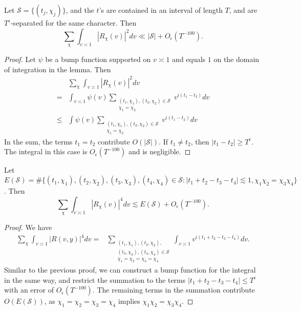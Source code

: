     \begin{lemma} \label{secondmoment1}
        Let $\mathcal{S}=\{(t_j,\chi_j)\}$, and the $t$'s are contained in an interval of length $T$, and are $T^\epsilon$-separated for the same character. Then \[
            \sum_{\chi} \int_{v\asymp 1} 
            \left|R_{\chi}\left(v\right)\right|^2dv \ll |\mathcal{S}|+ O_{\epsilon}(T^{-100}).
        \]
    \end{lemma}
    \begin{proof}
        
        Let $\psi$ be a bump function supported on $v\asymp 1$ and equals $1$ on the domain of integration in the lemma. Then
       \begin{align*}
        &\sum_{\chi} \int_{v\asymp 1} 
            \left|R_{\chi}\left(v\right)\right|^2dv\\
            =&\int_{v\asymp 1} \psi(v)\sum_{\substack{(t_1,\chi_1),(t_2,\chi_2)\in \mathcal{S}\\ \chi_1=\chi_2}}v^{i(t_1-t_2)}dv \\
            \leq&\int 
        \psi(v)\sum_{\substack{(t_1,\chi_1),(t_2,\chi_2)\in \mathcal{S}\\ \chi_1=\chi_2}}v^{i(t_1-t_2)}dv
        \end{align*}
        In the sum, the terms $t_1=t_2$ contribute $O(|\mathcal{S}|)$. If $t_1\neq t_2$, then $|t_1-t_2|\geq T^\epsilon$. The integral in this case is $O_\epsilon(T^{-100})$ and is negligible.
    \end{proof}
    \begin{lemma}\label{fourthmoment1}
        Let $E(\mathcal{S})=\#\{(t_1,\chi_1),(t_2,\chi_2),(t_3,\chi_3),(t_4,\chi_4)\in \mathcal{S}  :  |t_1+t_2-t_3-t_4|\lesssim 1, \chi_1\chi_2=\chi_3\chi_4\}$. Then \[
            \sum_{\chi} \int_{v\asymp 1} 
            \left|R_{\chi}\left(v\right)\right|^4dv \lesssim E(\mathcal{S}) + O_{\epsilon}(T^{-100}).
        \]
    \end{lemma}
    \begin{proof}
        We have
        \begin{align*}
            \sum_{\chi} \int_{v\asymp 1} 
            \left|R\left(v,y\right)\right|^4dv = & 
            \sum_{\substack{(t_1,\chi_1),(t_2,\chi_2),\\ (t_3,\chi_3),(t_4,\chi_4)\in \mathcal{S}\\ \chi_1=\chi_2=\chi_3=\chi_4}} \int_{v\asymp 1} v^{i(t_1+t_2-t_3-t_4)} dv.
        \end{align*}
        Similar to the previous proof, we can construct a bump function for the integral in the same way, and restrict the summation to the terms $|t_1+t_2-t_3-t_4|\leq T^\epsilon$ with an error of $O_\epsilon(T^{-100})$. The remaining terms in the summation contribute $O(E(\mathcal{S}))$, as $\chi_1=\chi_2=\chi_3=\chi_4$ implies $\chi_1\chi_2=\chi_3\chi_4$.
    \end{proof}

